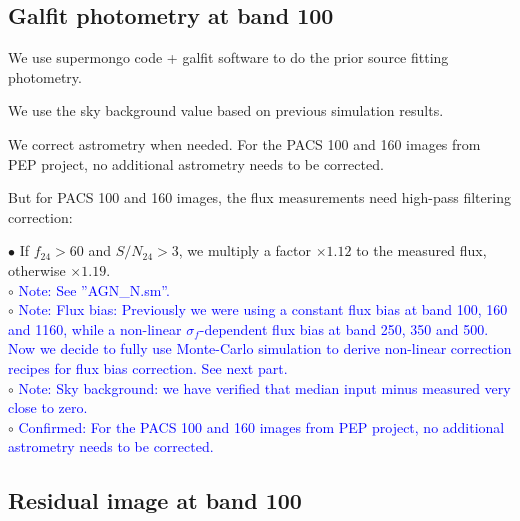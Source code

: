 \documentclass[11pt,a4paper]{article}
\begin{document}
\subsection{Galfit photometry at band 100}
\label{Band100_Galfit}

We use supermongo code + galfit software to do the prior source fitting photometry. 

We use the sky background value based on previous simulation results. 

We correct astrometry when needed. For the PACS 100 and 160 images from PEP project, no additional astrometry needs to be corrected. 

But for PACS 100 and 160 images, the flux measurements need high-pass filtering correction: 

\indent\hspace{15pt}$\bullet$ 
If $f_{24}>60$ and $S/N_{24}>3$, we multiply a factor $\times 1.12$ to the measured flux, otherwise $\times 1.19$. 
\\
\indent\hspace{15pt}$\circ$ 
\textcolor{blue}{Note: See ''AGN\_N.sm''.}
\\
\indent\hspace{15pt}$\circ$ 
\textcolor{blue}{Note: Flux bias: Previously we were using a constant flux bias at band 100, 160 and 1160, while a non-linear $\sigma_{f}$-dependent flux bias at band 250, 350 and 500. Now we decide to fully use Monte-Carlo simulation to derive non-linear correction recipes for flux bias correction. See next part. }
\\
\indent\hspace{15pt}$\circ$ 
\textcolor{blue}{Note: Sky background: we have verified that median input minus measured very close to zero.}
\\
\indent\hspace{15pt}$\circ$ 
\textcolor{blue}{Confirmed: For the PACS 100 and 160 images from PEP project, no additional astrometry needs to be corrected.}
\\

\subsection{Residual image at band 100}
\label{Band100_Galres}
\end{document}
